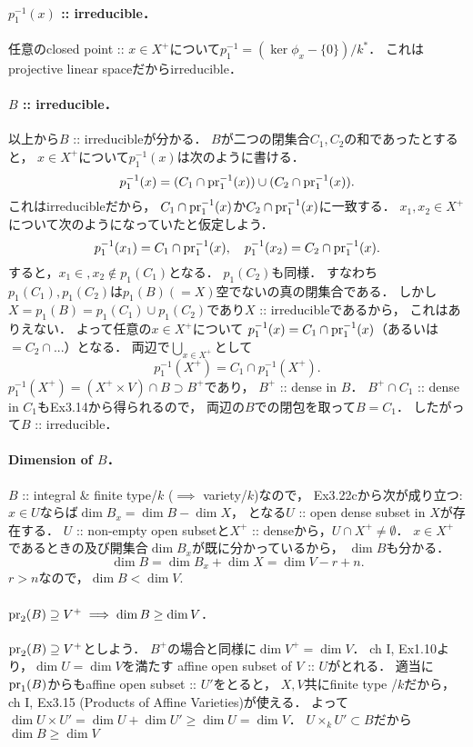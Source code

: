 \documentclass[a4paper]{jsarticle}
\begin{document}
    \paragraph{$p_1^{-1}(x)$ :: irreducible．}
    任意のclosed point :: $x \in X^+$について$p_1^{-1}=(\ker \phi_x-\{0\})/k^*$．
    これはprojective linear spaceだからirreducible．

    \paragraph{$B$ :: irreducible．}
    以上から$B$ :: irreducibleが分かる．
    $B$が二つの閉集合$C_1, C_2$の和であったとすると，
    $x \in X^+$について$p_1^{-1}(x)$は次のように書ける．
    \[ p_1^{-1}(x)=(C_1 \cap \operatorname{pr}_1^{-1}(x)) \cup (C_2 \cap \operatorname{pr}_1^{-1}(x)). \]
    これはirreducibleだから，
    $C_1 \cap \operatorname{pr}_1^{-1}(x)$か$C_2 \cap \operatorname{pr}_1^{-1}(x)$に一致する．
    $x_1, x_2 \in X^+$について次のようになっていたと仮定しよう．
    \[
        p_1^{-1}(x_1)=C_1 \cap \operatorname{pr}_1^{-1}(x),~~~
        p_1^{-1}(x_2)=C_2 \cap \operatorname{pr}_1^{-1}(x).
    \]
    すると，$x_1 \in, x_2 \not \in p_1(C_1)$となる．
    $p_1(C_2)$も同様．
    すなわち$p_1(C_1), p_1(C_2)$は$p_1(B)(=X)$空でないの真の閉集合である．
    しかし$X=p_1(B)=p_1(C_1) \cup p_1(C_2)$であり$X$ :: irreducibleであるから，
    これはありえない．
    よって任意の$x \in X^+$について
    $p_1^{-1}(x)=C_1 \cap \operatorname{pr}_1^{-1}(x)$（あるいは$=C_2 \cap$...）となる．
    両辺で$\bigcup_{x \in X^+}$として
    \[ p_1^{-1}(X^+)=C_1 \cap p_1^{-1}(X^+). \]
    $p_1^{-1}(X^+)=(X^+ \times V) \cap B \supset B^+$であり，
    $B^+$ :: dense in $B$．
    $B^+ \cap C_1$ :: dense in $C_1$もEx3.14から得られるので，
    両辺の$B$での閉包を取って$B=C_1$．
    したがって$B$ :: irreducible．

    \paragraph{Dimension of $B$．}
    $B$ :: integral \& finite type/$k$ ($\implies$ variety/$k$)なので，
    Ex3.22cから次が成り立つ:
    $x \in U$ならば$\dim B_x=\dim B-\dim X$，
    となる$U$ :: open dense subset in $X$が存在する．
    $U$ :: non-empty open subsetと$X^+$ :: denseから，$U \cap X^+ \neq \emptyset$．
    $x \in X^+$であるときの及び開集合$\dim B_x$が既に分かっているから，
    $\dim B$も分かる．
    \[ \dim B=\dim B_x+\dim X=\dim V-r+n. \]
    $r>n$なので，$\dim B<\dim V$.

    \paragraph{$\operatorname{pr}_2(B) \supseteq V^+ \implies \dim B \geq \dim V$.}
    $\operatorname{pr}_2(B) \supseteq V^+$としよう．
    $B^+$の場合と同様に$\dim V^+=\dim V$．
    ch I, Ex1.10より，$\dim U=\dim V$を満たす
    affine open subset of $V$ :: $U$がとれる．
    適当に$\operatorname{pr}_1(B)$からもaffine open subset ::  $U'$をとると，
    $X, V$共にfinite type /$k$だから，
    ch I, Ex3.15 (Products of Affine Varieties)が使える．
    よって$\dim U \times U'=\dim U+\dim U' \geq \dim U=\dim V$．
    $U \times_k U' \subset B$だから$\dim B \geq \dim V$
    
\end{document}
